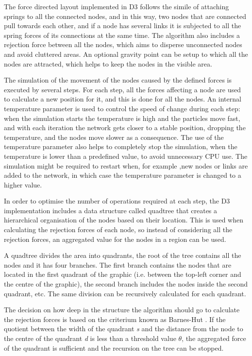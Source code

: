 The force directed layout implemented in D3 follows the simile of attaching springs to all the connected nodes, and in this way, two nodes that are connected pull towards each other, and if a node has several links it is subjected to all the spring forces of its connections at the same time. The algorithm also includes a rejection force between all the nodes, which aims to disperse unconnected nodes and avoid cluttered areas. An optional gravity point can be setup to which all the nodes are attracted, which helps to keep the nodes in the visible area. 

The simulation of the movement of the nodes caused by the defined forces is executed by several steps. For each step, all the forces affecting a node are used to calculate a new position for it, and this is done for all the nodes. An internal temperature parameter is used to control the speed of change during each step: when the simulation starts the temperature is high and the particles move fast, and with each iteration the network gets closer to a stable position, dropping the temperature, and the nodes move slower as a consequence. The use of the temperature parameter also helps to completely stop the simulation, when the temperature is lower than a predefined value, to avoid unnecessary CPU use. The simulation might be required to restart when, for example ,new nodes or links are added to the network, in which case the temperature parameter is changed to a higher value.

In order to optimise the number of operations required at each step, the D3 implementation includes a data structure called quadtree that creates a hierarchical organisation of the nodes based on their location. This is used when calculating the rejection forces of each node, so instead of considering all the rejection forces, an aggregated value for the nodes in a region can be used.

A quadtree divides the area into quadrants, the root of the tree contains all the nodes and it has four branches. The first branch contains the nodes that are located in the first quadrant of the graphic (i.e. between the top-left corner and the centre of the graphic), the second branch includes the nodes inside the second quadrant, etc. The same division can be recursively calculated for each quadrant.

The decision on how deep in the structure the algorithm should go to calculate the rejection forces is based on the criterium known as Barnes-Hut \cite{BAR1986}. If the quotient between the width of the quadrant \emph{s} and the distance from the node to the centre of the quadrant \emph{d} is less than a threshold value $\theta$, the aggregated force of the quadrant is sufficient and the recursion on the tree can be stopped. 

